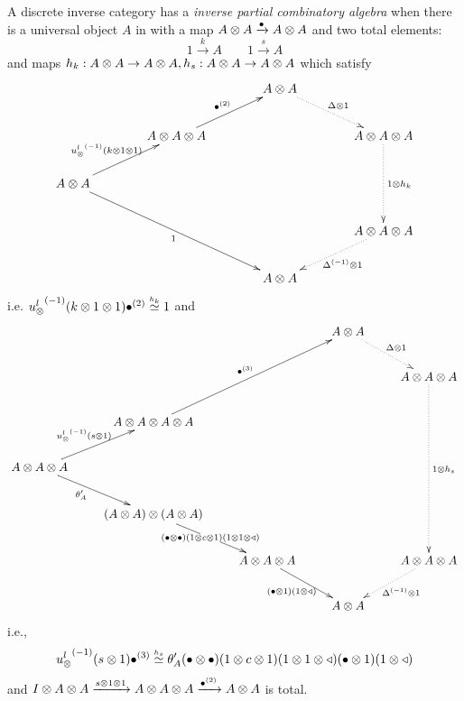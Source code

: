 \begin{definition}\label{def:inverse_partial_combinatory_algebra}
  A discrete inverse category \X has a \emph{inverse partial combinatory algebra} when there is a
  universal object $A$ in \X with a map $A\otimes A \xrightarrow{\bullet} A\otimes A$ and two total
  elements:
  \[
      1\xrightarrow{k}A \qquad 1\xrightarrow{s}{A}
  \]
  and maps
    $h_k:A\otimes A\to A\otimes A, h_s:A\otimes A\to A\otimes A$ which satisfy
    \[
      \xymatrix@C+15pt{
         && A\*A \ar@{.>}[dr]^{\Delta\*1}\\
        &A\* A\* A \ar[ur]^{\multibullet{2}} & & A\*A\*A\ar@{.>}[dd]^{1\*h_k}\\
        A\* A \ar[ur]^{\inv{\usl}(k\*1\*1)} \ar[ddrr]_{1} && &\\
         && & A\*A\*A \ar@{.>}[dl]^{\inv{\Delta}\*1}\\
        && A\*A &
      }
    \]
    i.e. ${u_{\otimes}^l}^{(-1)}(k\otimes1\otimes1){\bullet}^{(2)} \overset{\scriptscriptstyle h_k}{\simeq}1$ and
    \[
      \xymatrix{
        &&& A\* A \ar@{.>}[dr]^{\Delta\*1} \\
        & &  && A\* A\* A \ar@{.>}[dddd]^{1\*h_s}\\
        &A\* A\* A\* A
          \ar[uurr]^{\multibullet{3}}\\
        A\* A\* A \ar[ur]^{\inv{\usl}(s\*1)} \ar[dr]_(.4){\theta_A'}\\
        &(A\* A) \* (A\* A) \ar[dr]|{(\bullet\*\bullet)(1\*c\*1)(1\*1\*\retract)} \\
        & &A\* A\* A\ar[dr]_{(\bullet\*1)(1\*\retract)}& &A\*A\*A \ar@{.>}[dl]^{\inv{\Delta}\*1}\\
        &&&A\*A \\
      }
    \]
    i.e.,
    \[
      {u_{\otimes}^l}^{(-1)}(s\otimes1){\bullet}^{(3)} \overset{\scriptscriptstyle h_s}{\simeq}
      \theta_A'(\bullet\otimes\bullet)(1\otimes c\otimes1)(1\otimes1\otimes\triangleleft)(\bullet\otimes1)(1\otimes\triangleleft)
    \]
    and $I\otimes A\otimes A \xrightarrow{s\otimes1\otimes1} A\otimes A\otimes A \xrightarrow{{\bullet}^{(2)}} A\otimes A$ is total.
\end{definition}




